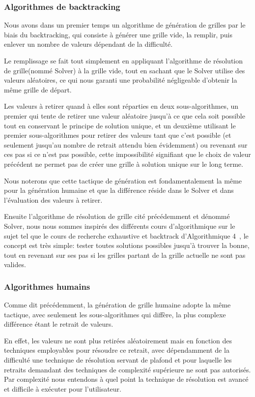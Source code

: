 \documentclass[a4paper]{article}
\begin{document}
\subsubsection{Algorithmes de backtracking}
Nous avons dans un premier temps un algorithme de génération de grilles par le biais du backtracking, qui consiste à générer une grille vide, la remplir, puis enlever un nombre de valeurs dépendant de la difficulté. 

Le remplissage se fait tout simplement en appliquant l'algorithme de résolution de grille(nommé Solver) à la grille vide, tout en sachant que le Solver utilise des valeurs aléatoires, ce qui nous garanti une probabilité négligeable d'obtenir la même grille de départ. 

Les valeurs à retirer quand à elles sont réparties en deux sous-algorithmes, un premier qui tente de retirer une valeur aléatoire jusqu'à ce que cela soit possible tout en conservant le principe de solution unique, et un deuxième utilisant le premier sous-algorithmes pour retirer des valeurs tant que c'est possible (et seulement jusqu'au nombre de retrait attendu bien évidemment) ou revenant sur ces pas si ce n'est pas possible, cette impossibilité signifiant que le choix de valeur précédent ne permet pas de créer une grille à solution unique sur le long terme.

Nous noterons que cette tactique de génération est fondamentalement la même pour la génération humaine et que la différence réside dans le Solver et dans l'évaluation des valeurs à retirer.

Ensuite l'algorithme de résolution de grille cité précédemment et dénommé Solver, nous nous sommes inspirés des différents cours d'algorithmique sur le sujet tel que le cours de recherche exhaustive et backtrack d'Algorithmique 4~\textbf{\cite{coursAlgo}}, le concept est très simple: tester toutes solutions possibles jusqu'à trouver la bonne, tout en revenant sur ses pas si les grilles partant de la grille actuelle ne sont pas valides.

\subsubsection{Algorithmes humains}
Comme dit précédemment, la génération de grille humaine adopte la même tactique, avec seulement les sous-algorithmes qui diffère, la plus complexe différence étant le retrait de valeurs. 

En effet, les valeurs ne sont plus retirées aléatoirement mais en fonction des techniques employables pour résoudre ce retrait, avec dépendamment de la difficulté une technique de résolution servant de plafond et pour laquelle les retraits demandant des techniques de complexité supérieure ne sont pas autorisés. Par complexité nous entendons à quel point la technique de résolution est avancé et difficile à exécuter pour l'utilisateur. 
\end{document}
